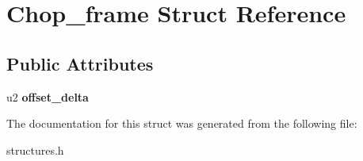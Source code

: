 \hypertarget{structChop__frame}{}\section{Chop\+\_\+frame Struct Reference}
\label{structChop__frame}
\subsection*{Public Attributes}
\begin{DoxyCompactItemize}
\item 
u2 {\bfseries offset\+\_\+delta}\hypertarget{structChop__frame_ae9ef25b530d108a044102edff5909cf4}{}\label{structChop__frame_ae9ef25b530d108a044102edff5909cf4}

\end{DoxyCompactItemize}


The documentation for this struct was generated from the following file\+:\begin{DoxyCompactItemize}
\item 
structures.\+h\end{DoxyCompactItemize}
